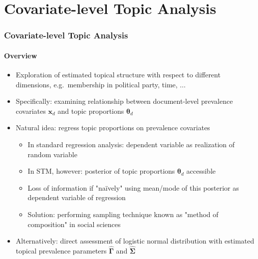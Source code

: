 \documentclass[xcolor=dvipsnames]{beamer}
\begin{document}
\section{Covariate-level Topic Analysis}
\begin{frame}
\frametitle{Covariate-level Topic Analysis}
\framesubtitle{Overview}
\begin{itemize}
\item Exploration of estimated topical structure with respect to different dimensions, e.g.\ membership in political party, time, $\dots$
\item Specifically: examining relationship between document-level prevalence covariates $\boldsymbol{x}_d$ and topic proportions $\boldsymbol{\theta}_d$
\item Natural idea: regress topic proportions on prevalence covariates
\begin{itemize}
\item In standard regression analysis: dependent variable as realization of random variable
\item In STM, however: posterior of topic proportions $\boldsymbol{\theta}_d$ accessible
\item Loss of information if "na{\"i}vely" using mean/mode of this posterior as dependent variable of regression
\item Solution: performing sampling technique known as "method of composition" in social sciences
\end{itemize}
\item Alternatively: direct assessment of logistic normal distribution with estimated topical prevalence parameters $\hat{\boldsymbol{\Gamma}}$ and $\hat{\boldsymbol{\Sigma}}$
\end{itemize}
\end{frame}
\end{document}
